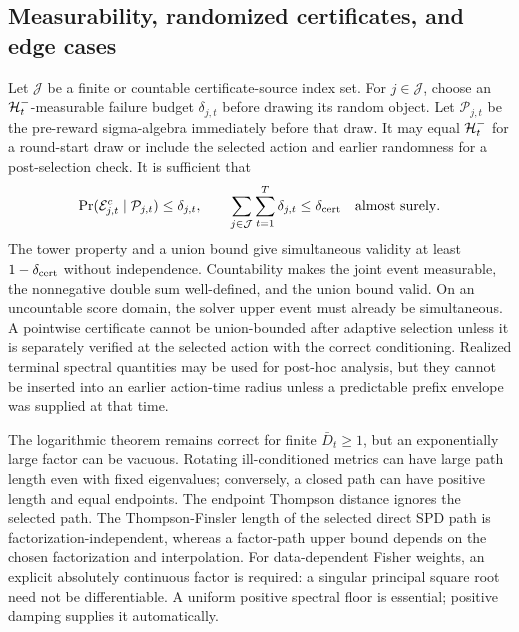 \subsection{Measurability, randomized certificates, and edge cases}

Let $\mathcal J$ be a finite or countable certificate-source index set.  For
$j\in\mathcal J$, choose an $\mathcal{H}_t^-$-measurable failure budget
$\delta_{j,t}$ before drawing its random object.  Let $\mathcal P_{j,t}$ be the
pre-reward sigma-algebra immediately before that draw.  It may equal
$\mathcal{H}_t^-$ for a round-start draw or include the selected action and earlier
randomness for a post-selection check.  It is sufficient that
\[
 \Pr(\mathcal E_{j,t}^c\mid\mathcal P_{j,t})\le\delta_{j,t},
 \qquad
 \sum_{j\in\mathcal J}\sum_{t=1}^T\delta_{j,t}
 \le\delta_{\rm cert}\quad\text{almost surely}.
\]
The tower property and a union bound give simultaneous validity at least
$1-\delta_{\rm cert}$ without independence.  Countability makes the joint
event measurable, the nonnegative double sum well-defined, and the union bound
valid.  On an uncountable score domain,
the solver upper event must already be simultaneous.  A pointwise certificate
cannot be union-bounded after adaptive selection unless it is separately
verified at the selected action with the correct conditioning.
Realized terminal spectral quantities may be used for post-hoc analysis, but
they cannot be inserted into an earlier action-time radius unless a predictable
prefix envelope was supplied at that time.

The logarithmic theorem remains correct for finite $\bar D_t\ge1$, but an
exponentially large factor can be vacuous.  Rotating ill-conditioned metrics
can have large path length even with fixed eigenvalues; conversely, a closed
path can have positive length and equal endpoints.  The endpoint Thompson
distance ignores the selected path.  The Thompson-Finsler length of the
selected direct SPD path is factorization-independent, whereas a factor-path
upper bound depends on the chosen factorization and interpolation.
For data-dependent Fisher weights, an explicit absolutely continuous factor is
required: a singular principal square root need not be differentiable.  A
uniform positive spectral floor is essential; positive damping supplies it
automatically.



